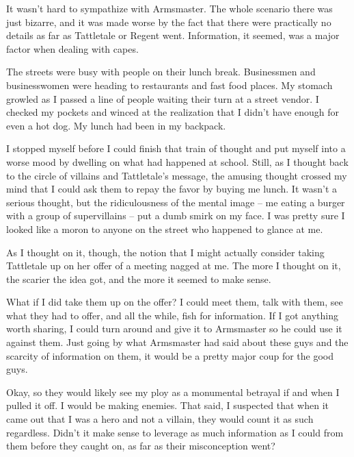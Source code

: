It wasn't hard to sympathize with Armsmaster.  The whole scenario there was just bizarre, and it was made worse by the fact that there were practically no details as far as Tattletale or Regent went.  Information, it seemed, was a major factor when dealing with capes.



The streets were busy with people on their lunch break.  Businessmen and businesswomen were heading to restaurants and fast food places.  My stomach growled as I passed a line of people waiting their turn at a street vendor.  I checked my pockets and winced at the realization that I didn't have enough for even a hot dog.  My lunch had been in my backpack.



I stopped myself before I could finish that train of thought and put myself into a worse mood by dwelling on what had happened at school.  Still, as I thought back to the circle of villains and Tattletale's message, the amusing thought crossed my mind that I could ask them to repay the favor by buying me lunch.  It wasn't a serious thought, but the ridiculousness of the mental image – me eating a burger with a group of supervillains – put a dumb smirk on my face.  I was pretty sure I looked like a moron to anyone on the street who happened to glance at me.



As I thought on it, though, the notion that I might actually consider taking Tattletale up on her offer of a meeting nagged at me.  The more I thought on it, the scarier the idea got, and the more it seemed to make sense.



What if I did take them up on the offer?  I could meet them, talk with them, see what they had to offer, and all the while, fish for information.  If I got anything worth sharing, I could turn around and give it to Armsmaster so he could use it against them.  Just going by what Armsmaster had said about these guys and the scarcity of information on them, it would be a pretty major coup for the good guys.



Okay, so they would likely see my ploy as a monumental betrayal if and when I pulled it off.  I would be making enemies.  That said, I suspected that when it came out that I was a hero and not a villain, they would count it as such regardless.  Didn't it make sense to leverage as much information as I could from them before they caught on, as far as their misconception went?




